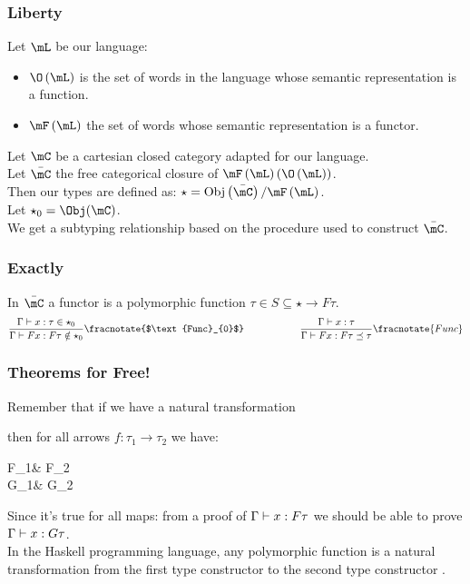 \documentclass[math, english, info, noamsthm]{beamercours}
\begin{document}
\begin{frame}
	\frametitle{Liberty}
	Let $\mL$ be our language:
	\begin{itemize}
		\item $\O\left( \mL \right)$ is the set of words in the language whose semantic representation is a function.
		\item $\mF\left( \mL \right)$ the set of words whose semantic representation is a functor.
	\end{itemize}
	Let $\mC$ be a cartesian closed category adapted for our language. \pause\\
	Let $\bar{\mC}$ the free categorical closure of $\mF\left( \mL \right)\left(\O\left( \mL \right)\right)$.\\
	Then our types are defined as: $\star = \mathrm{Obj}\left( \bar{\mC} \right)/\mF\left( \mL \right)$.\\
	Let $\star_{0} = \Obj(\mC)$.\\
	We get a subtyping relationship based on the procedure used to construct $\bar{\mC}$.
\end{frame}

\begin{frame}
	\frametitle{Exactly}
	In $\bar{\mC}$ a functor is a polymorphic function $\tau \in S \subseteq \star \to F \tau$. \pause\\
	\begin{equation*}
		\frac{\Gamma\vdash x: \tau \in \star_{0}}{\Gamma\vdash F x: F\tau \notin \star_{0}}\fracnotate{$\text{Func}_{0}$} \hspace{2cm} \frac{\Gamma\vdash x: \tau}{\Gamma\vdash Fx : F\tau\preceq \tau}\fracnotate{Func}
	\end{equation*}
\end{frame}

\begin{frame}[fragile]
	\frametitle{Theorems for Free!}
	Remember that if we have a natural transformation  then for all arrows $f: \tau_{1} \to \tau_{2}$ we have:
\begin{category}
	F\tau_{1}\ar[r, "Ff"] & F\tau_{2}\\
	G\tau_{1}\ar[r, "Gf"] & G\tau_{2}
\end{category}
\pause
	Since it's true for all maps: from a proof of $\Gamma\vdash x: F\tau$ we should be able to prove $\Gamma\vdash x: G\tau$.\\
	\pause
	In the Haskell programming language, any polymorphic function is a natural transformation from the first type constructor to the second type constructor \cite{wadlerTheoremsFree1989}.
\end{frame}
\end{document}
